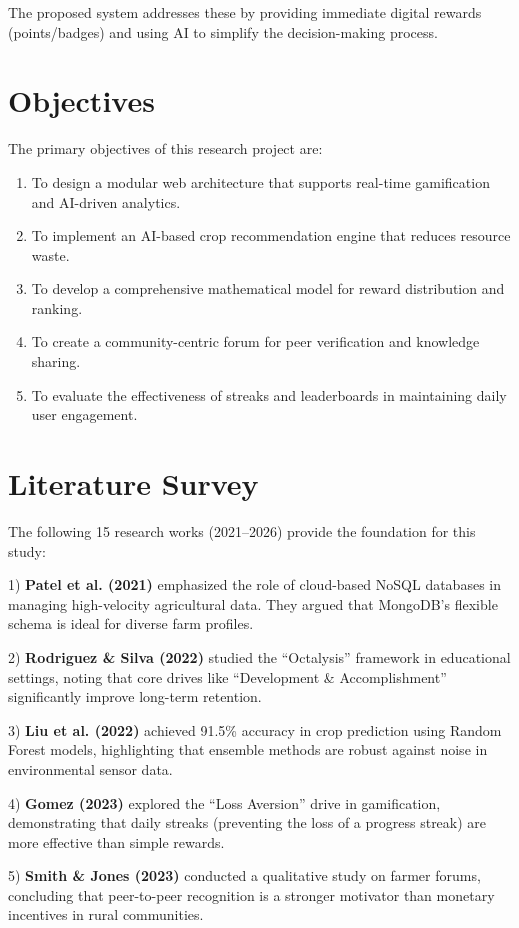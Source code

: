 \documentclass[journal]{IEEEtran}
\begin{document}
The proposed system addresses these by providing immediate digital rewards (points/badges) and using AI to simplify the decision-making process.

\section{Objectives}
The primary objectives of this research project are:
\begin{enumerate}
    \item To design a modular web architecture that supports real-time gamification and AI-driven analytics.
    \item To implement an AI-based crop recommendation engine that reduces resource waste.
    \item To develop a comprehensive mathematical model for reward distribution and ranking.
    \item To create a community-centric forum for peer verification and knowledge sharing.
    \item To evaluate the effectiveness of streaks and leaderboards in maintaining daily user engagement.
\end{enumerate}

\section{Literature Survey}
The following 15 research works (2021--2026) provide the foundation for this study:

1) \textbf{Patel et al. (2021)} emphasized the role of cloud-based NoSQL databases in managing high-velocity agricultural data. They argued that MongoDB's flexible schema is ideal for diverse farm profiles.

2) \textbf{Rodriguez \& Silva (2022)} studied the ``Octalysis'' framework in educational settings, noting that core drives like ``Development \& Accomplishment'' significantly improve long-term retention.

3) \textbf{Liu et al. (2022)} achieved 91.5\% accuracy in crop prediction using Random Forest models, highlighting that ensemble methods are robust against noise in environmental sensor data.

4) \textbf{Gomez (2023)} explored the ``Loss Aversion'' drive in gamification, demonstrating that daily streaks (preventing the loss of a progress streak) are more effective than simple rewards.

5) \textbf{Smith \& Jones (2023)} conducted a qualitative study on farmer forums, concluding that peer-to-peer recognition is a stronger motivator than monetary incentives in rural communities.
\end{document}
